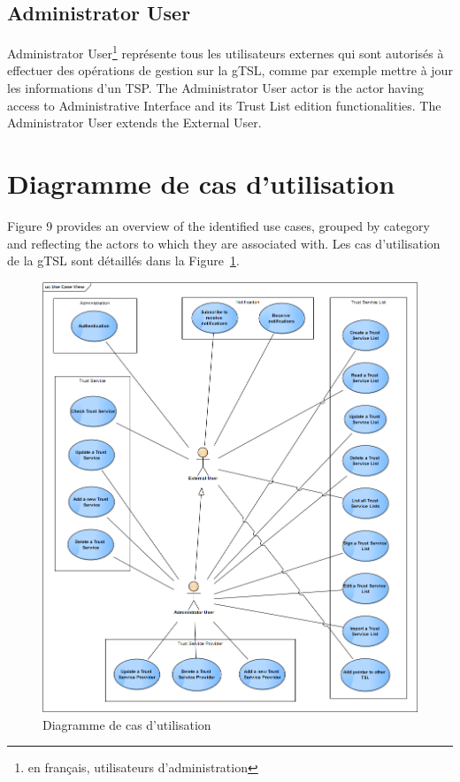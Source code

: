 \documentclass{tnreport}
\begin{document}
\subsection{Administrator User}

Administrator User\footnote{en français, utilisateurs d'administration} représente tous les utilisateurs externes qui sont autorisés à effectuer des opérations de gestion sur la gTSL, comme par exemple mettre à jour les informations d'un TSP.
The Administrator User actor is the actor having access to Administrative Interface and its Trust List edition functionalities. The Administrator User extends the External User.

\section{Diagramme de cas d'utilisation}

Figure 9 provides an overview of the identified use cases, grouped by category and reflecting the actors to which they are associated with.
Les cas d'utilisation de la gTSL sont détaillés dans la Figure~\ref{fig:use-case-diagram}. 

\begin{figure}[h]
	\centering
	\includegraphics[scale=0.55]{figures/use-case-diagram}
	\caption{Diagramme de cas d'utilisation}
	\label{fig:use-case-diagram}
\end{figure}
\clearpage
\end{document}
